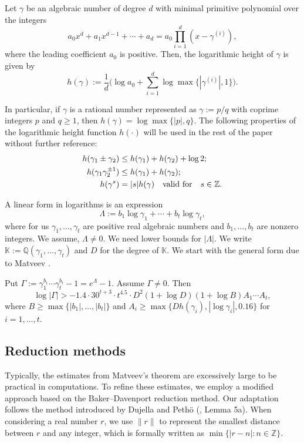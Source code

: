 \begin{definition}\label{def2.1l}
	Let $ \gamma $ be an algebraic number of degree $ d $ with minimal primitive polynomial over the integers $$ a_{0}x^{d}+a_{1}x^{d-1}+\cdots+a_{d}=a_{0}\prod_{i=1}^{d}(x-\gamma^{(i)}), $$ where the leading coefficient $ a_{0} $ is positive. Then, the logarithmic height of $ \gamma$ is given by $$ h(\gamma):= \dfrac{1}{d}\Big(\log a_{0}+\sum_{i=1}^{d}\log \max\{|\gamma^{(i)}|,1\} \Big). $$
\end{definition}
 In particular, if $ \gamma$ is a rational number represented as $\gamma:=p/q$ with coprime integers $p$ and $ q\ge 1$, then $ h(\gamma ) = \log \max\{|p|, q\} $. 
The following properties of the logarithmic height function $ h(\cdot) $ will be used in the rest of the paper without further reference:
\begin{equation}\nonumber
	\begin{aligned}
		h(\gamma_{1}\pm\gamma_{2}) &\leq h(\gamma_{1})+h(\gamma_{2})+\log 2;\\
		h(\gamma_{1}\gamma_{2}^{\pm 1} ) &\leq h(\gamma_{1})+h(\gamma_{2});\\
		h(\gamma^{s}) &= |s|h(\gamma)  \quad {\text{\rm valid for}}\quad s\in \mathbb{Z}.
	\end{aligned}
\end{equation}

A linear form in logarithms is an expression
\begin{equation}
	\label{eq:Lambdal}
	\Lambda:=b_1\log \gamma_1+\cdots+b_t\log \gamma_t,
\end{equation}
where for us $\gamma_1,\ldots,\gamma_t$ are positive real  algebraic numbers and $b_1,\ldots,b_t$ are nonzero integers. We assume, $\Lambda\ne 0$. We need lower bounds 
for $|\Lambda|$. We write ${\mathbb K}:={\mathbb Q}(\gamma_1,\ldots,\gamma_t)$ and $D$ for the degree of ${\mathbb K}$.
We start with the general form due to Matveev \cite{matl}. 

\begin{theorem}
	\label{thm:Matl} 
	Put $\Gamma:=\gamma_1^{b_1}\cdots \gamma_t^{b_t}-1=e^{\Lambda}-1$. Assume $\Gamma\ne 0$. Then 
	$$
	\log |\Gamma|>-1.4\cdot 30^{t+3}\cdot t^{4.5} \cdot D^2 (1+\log D)(1+\log B)A_1\cdots A_t,
	$$
	where $B\ge \max\{|b_1|,\ldots,|b_t|\}$ and $A_i\ge \max\{Dh(\gamma_i),|\log \gamma_i|,0.16\}$ for $i=1,\ldots,t$.
\end{theorem}


\subsection{Reduction methods}
Typically, the estimates from Matveev's theorem are excessively large to be practical in computations. To refine these estimates, we employ a modified approach based on the Baker--Davenport reduction method. Our adaptation follows the method introduced by Dujella and Pethö (\cite{duj}, Lemma 5a). When considering a real number \( r \), we use \( \| r \| \) to represent the smallest distance between \( r \) and any integer, which is formally written as \( \min\{|r - n| : n \in \mathbb{Z}\} \).

